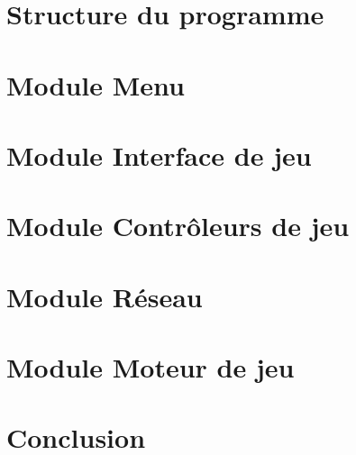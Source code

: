 \section{Structure du programme}%


\newpage

\section{Module Menu}

\newpage

\section{Module Interface de jeu}

\newpage

\section{Module Contrôleurs de jeu}

\newpage

\section{Module Réseau}

\newpage

\section{Module Moteur de jeu}

\newpage

\section*{Conclusion}


\newpage


\appendix

\renewcommand{\appendixpagename}{Annexes}
\renewcommand{\appendixtocname}{Annexes}

\noappendicestocpagenum

\appendixpage
\addappheadtotoc

